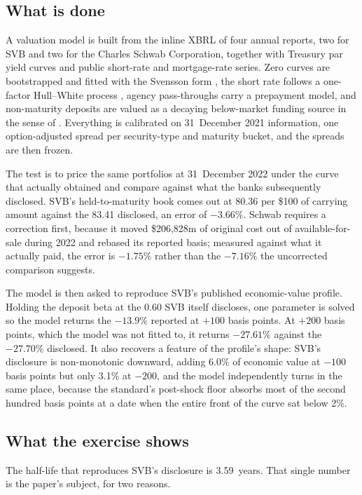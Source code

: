 \subsection{What is done}

A valuation model is built from the inline XBRL of four annual reports, two for SVB
and two for the Charles Schwab Corporation, together with Treasury par yield curves
and public short-rate and mortgage-rate series. Zero curves are bootstrapped and
fitted with the Svensson form \citep{NelsonSiegel1987, Svensson1994}, the short rate
follows a one-factor Hull--White process \citep{HullWhite1990}, agency pass-throughs
carry a prepayment model, and non-maturity deposits are valued as a decaying
below-market funding source in the sense of \citet{Drechsler2021}. Everything is
calibrated on 31~December 2021 information, one option-adjusted spread per
security-type and maturity bucket, and the spreads are then frozen.

The test is to price the same portfolios at 31~December 2022 under the curve that
actually obtained and compare against what the banks subsequently disclosed. SVB's
held-to-maturity book comes out at 80.36 per \$100 of carrying amount against the
83.41 disclosed, an error of $-3.66\%$. Schwab requires a correction first, because it
moved \$206,828m of original cost out of available-for-sale during 2022 and rebased
its reported basis; measured against what it actually paid, the error is $-1.75\%$
rather than the $-7.16\%$ the uncorrected comparison suggests.

The model is then asked to reproduce SVB's published economic-value profile. Holding
the deposit beta at the 0.60 SVB itself discloses, one parameter is solved so the
model returns the $-13.9\%$ reported at $+100$
basis points. At $+200$ basis points, which the model was not fitted to, it returns
$-27.61\%$ against the $-27.70\%$ disclosed. It also recovers a feature of the
profile's shape: SVB's disclosure is non-monotonic downward, adding 6.0\% of economic
value at $-100$ basis points but only 3.1\% at $-200$, and the model independently
turns in the same place, because the standard's post-shock floor absorbs most of the
second hundred basis points at a date when the entire front of the curve sat below
2\%.

\subsection{What the exercise shows}

The half-life that reproduces SVB's disclosure is 3.59~years. That single number is
the paper's subject, for two reasons.


